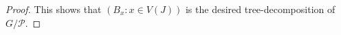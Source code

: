 \documentclass{patmorin}
\theoremstyle{plain}
\theoremstyle{definition}
\newcommand{\PP}{\mathcal{P}}
\begin{document}
\begin{proof}

This shows that $(B_x:x\in V(J))$ is the desired tree-decomposition of $G/\PP$.
\end{proof}
\end{document}
